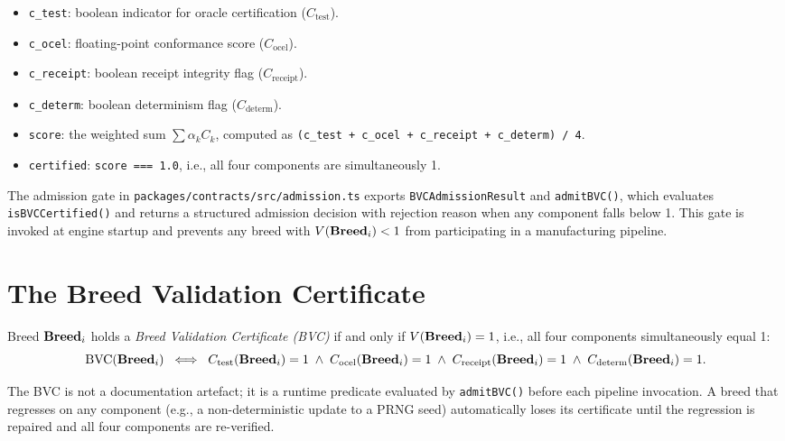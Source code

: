 \begin{itemize}
  \item \texttt{c\_test}: boolean indicator for oracle certification ($C_{\mathrm{test}}$).
  \item \texttt{c\_ocel}: floating-point conformance score ($C_{\mathrm{ocel}}$).
  \item \texttt{c\_receipt}: boolean receipt integrity flag ($C_{\mathrm{receipt}}$).
  \item \texttt{c\_determ}: boolean determinism flag ($C_{\mathrm{determ}}$).
  \item \texttt{score}: the weighted sum $\sum \alpha_k C_k$, computed as
        \texttt{(c\_test + c\_ocel + c\_receipt + c\_determ) / 4}.
  \item \texttt{certified}: \texttt{score === 1.0}, i.e., all four components are
        simultaneously 1.
\end{itemize}

\noindent The admission gate in \texttt{packages/contracts/src/admission.ts} exports
\texttt{BVCAdmissionResult} and \texttt{admitBVC()}, which evaluates
\texttt{isBVCCertified()} and returns a structured admission decision with rejection
reason when any component falls below 1. This gate is invoked at engine startup and
prevents any breed with $V(\mathbf{Breed}_i) < 1$ from participating in a manufacturing
pipeline.

\section{The Breed Validation Certificate}
\label{sec:bvc-definition}

\begin{definition}
\label{def:bvc}
Breed $\mathbf{Breed}_i$ holds a \emph{Breed Validation Certificate (BVC)} if and only if
$V(\mathbf{Breed}_i) = 1$, i.e., all four components simultaneously equal 1:
\[
  \mathrm{BVC}(\mathbf{Breed}_i)
  \;\iff\;
  C_{\mathrm{test}}(\mathbf{Breed}_i) = 1
  \;\wedge\;
  C_{\mathrm{ocel}}(\mathbf{Breed}_i) = 1
  \;\wedge\;
  C_{\mathrm{receipt}}(\mathbf{Breed}_i) = 1
  \;\wedge\;
  C_{\mathrm{determ}}(\mathbf{Breed}_i) = 1.
\]
\end{definition}

The BVC is not a documentation artefact; it is a runtime predicate evaluated by
\texttt{admitBVC()} before each pipeline invocation. A breed that regresses on any
component (e.g., a non-deterministic update to a PRNG seed) automatically loses its
certificate until the regression is repaired and all four components are re-verified.

